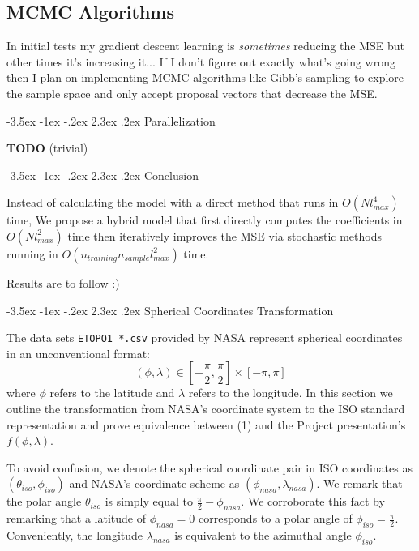 \documentclass[a4paper]{article}
\makeatletter
\renewcommand\section{\@startsection{section}{1}{\z@}%
                                  {-3.5ex \@plus -1ex \@minus -.2ex}%
                                  {2.3ex \@plus.2ex}%
                                  {\normalfont\normalsize\bfseries}}
\theoremstyle{definition}
\makeatother
\begin{document}
\subsection{MCMC Algorithms}

In initial tests my gradient descent learning is \textit{sometimes} reducing the MSE but other times it's increasing it... If I don't figure out exactly what's going wrong 
then I plan on implementing MCMC algorithms like Gibb's sampling to explore the sample space and only accept proposal vectors that decrease the MSE.

\section{Parallelization} 

\textbf{TODO} (trivial)

\section{Conclusion}

Instead of calculating the model with a direct method that runs in $O(Nl_{max}^4)$ time, We propose a hybrid model that first directly computes the coefficients in $O(Nl_{max}^2)$ time then 
iteratively improves the MSE via stochastic methods running in $O(n_{training}n_{sample}l_{max}^2)$ time.

Results are to follow :)





\appendix
\section{Spherical Coordinates Transformation}

The data sets \verb|ETOPO1_*.csv| provided by NASA represent spherical coordinates in an unconventional format: $$(\phi, \lambda) \in [-\frac{\pi}{2}, \frac{\pi}{2}] \times [-\pi, \pi] $$ where $\phi$ refers to the latitude
and $\lambda$ refers to the longitude. In this section we outline the transformation from NASA's coordinate system to the ISO standard representation and prove equivalence between (1) and the Project presentation's $f(\phi, \lambda)$.

To avoid confusion, we denote the spherical coordinate pair in ISO coordinates as $(\theta_{iso}, \phi_{iso})$ and NASA's coordinate scheme as $(\phi_{nasa}, \lambda_{nasa})$.
We remark that the polar angle $\theta_{iso}$ is simply equal to $\frac{\pi}{2} - \phi_{nasa}$. We corroborate this fact by remarking that a latitude of $\phi_{nasa} = 0$ corresponds to a polar
angle of $\phi_{iso} = \frac{\pi}{2}$. Conveniently, the longitude $\lambda_{nasa}$ is equivalent to the azimuthal angle $\phi_{iso}$.
\end{document}
